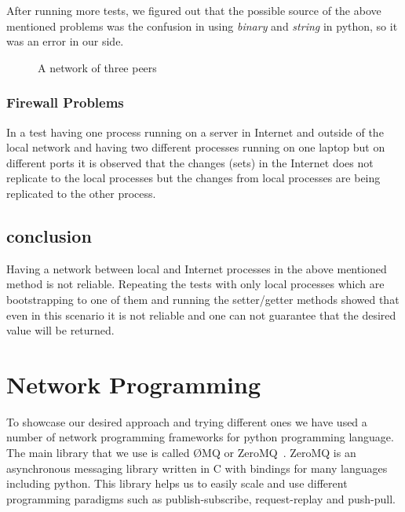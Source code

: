 After running more tests, we figured out that the possible source of the above mentioned problems was the confusion in using \textit{binary} and \textit{string} in python, so it was an error in our side.

\begin{figure}
\centering
{}
\caption{A network of three peers}
\label{fig:threepeers}
\end{figure}


\subsubsection{Firewall Problems}
In a test having one process running on a server in Internet and outside of the local network and having two different processes running on one laptop but on different ports it is observed that the changes (sets) in the Internet does not replicate to the local processes but the changes from local processes are being replicated to the other process.

\subsection{conclusion}
Having a network between local and Internet processes in the above mentioned method is not reliable. Repeating the tests with only local processes which are bootstrapping to one of them and running the setter/getter methods showed that even in this scenario it is not reliable and one can not guarantee that the desired value will be returned.


\section{Network Programming}
To showcase our desired approach and trying different ones we have used a number of network programming frameworks for python programming language. The main library that we use is called ØMQ or ZeroMQ~\cite{ZeroMQ}. ZeroMQ is an asynchronous messaging library written in C with bindings for many languages including python. This library helps us to easily scale and use different programming paradigms such as publish-subscribe, request-replay and push-pull.

